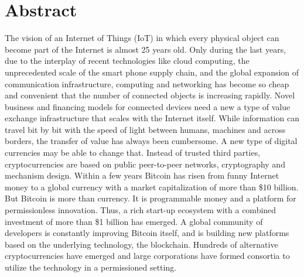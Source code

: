 \begingroup
\let\clearpage\relax
\let\cleardoublepage\relax
\let\cleardoublepage\relax

\chapter*{Abstract}

The vision of an Internet of Things (IoT) in which every physical object can become part of the Internet is almost 25 years old. Only during the last years, due to the interplay of recent technologies like cloud computing, the unprecedented scale of the smart phone supply chain, and the global expansion of communication infrastructure, computing and networking has become so cheap and convenient that the number of connected objects is increasing rapidly. Novel business and financing models for connected devices need a new a type of value exchange infrastructure that scales with the Internet itself. While information can travel bit by bit with the speed of light between humans, machines and across borders, the transfer of value has always been cumbersome. A new type of digital currencies may be able to change that. Instead of trusted third parties, cryptocurrencies are based on public peer-to-peer networks, cryptography and mechanism design. Within a few years Bitcoin has risen from funny Internet money to a global currency with a market capitalization of more than \$10 billion. But Bitcoin is more than currency. It is programmable money and a platform for permissionless innovation. Thus, a rich start-up ecosystem with a combined investment of more than \$1 billion has emerged. A global community of developers is constantly improving Bitcoin itself, and is building new platforms based on the underlying technology, the blockchain. Hundreds of alternative cryptocurrencies have emerged and large corporations have formed consortia to utilize the technology in a permissioned setting.

